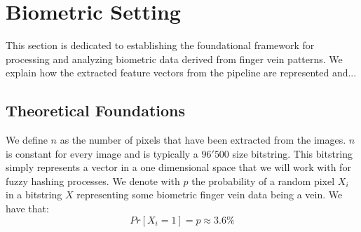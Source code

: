 \section{Biometric Setting}
This section is dedicated to establishing the foundational framework for processing and analyzing biometric data derived from finger vein patterns. We explain how the extracted feature vectors from the pipeline are represented and...

\subsection{Theoretical Foundations}
We define \(n\) as the number of pixels that have been extracted from the images. \(n\) is constant for every image and is typically a \(96'500\) size bitstring. This bitstring simply represents a vector in a one dimensional space that we will work with for fuzzy hashing processes. We denote with \(p\) the probability of a random pixel \(X_i\) in a bitstring \(X\) representing some biometric finger vein data being a vein. We have that:
\[
    Pr[X_i = 1] = p \approx 3.6 \%
\]










